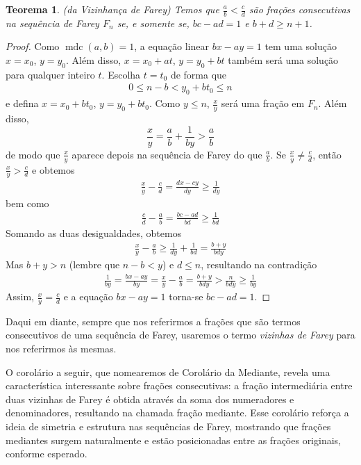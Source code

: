 \documentclass{hipatia}
\newtheorem*{theorem*}{Teorema}
\theoremstyle{definition} %
\begin{document}
\begin{theorem*} (da Vizinhança de Farey)
Temos que \(\frac{a}{b} < \frac{c}{d}\) são frações consecutivas na sequência de Farey \(F_n\) se, e somente se, \(bc - ad = 1\) e $b+d\geq n+1$.
\end{theorem*}

\begin{proof}
Como \(\operatorname{mdc}(a, b) = 1\), a equação linear \(bx - ay = 1\) tem uma solução \(x = x_0\), \(y = y_0\). Além disso, \(x = x_0 + at\), \(y = y_0 + bt\) também será uma solução para qualquer inteiro \(t\). Escolha \(t = t_0\) de forma que
\begin{align*}
0 \leq n - b < y_0 + bt_0 \leq n
\end{align*}
e defina \(x = x_0 + bt_0\), \(y = y_0 + bt_0\). Como \(y \leq n\), \(\frac{x}{y}\) será uma fração em \(F_n\). Além disso,
\[
\frac{x}{y} = \frac{a}{b} + \frac{1}{by} > \frac{a}{b}
\]
de modo que \(\frac{x}{y}\) aparece depois na sequência de Farey do que \(\frac{a}{b}\). Se \(\frac{x}{y} \neq \frac{c}{d}\), então \(\frac{x}{y} > \frac{c}{d}\) e obtemos
\begin{align*}
\frac{x}{y} - \frac{c}{d} = \frac{dx - cy}{dy} \geq \frac{1}{dy}
\end{align*}
bem como
\begin{align*}
\frac{c}{d} - \frac{a}{b} = \frac{bc - ad}{bd} \geq \frac{1}{bd}
\end{align*}
Somando as duas desigualdades, obtemos
\begin{align*}
\frac{x}{y} - \frac{a}{b} \geq \frac{1}{dy} + \frac{1}{bd} = \frac{b + y}{bdy}
\end{align*}
Mas \(b + y > n\) (lembre que \(n - b < y\)) e \(d \leq n\), resultando na contradição
\begin{align*}
\frac{1}{by} = \frac{bx - ay}{by} = \frac{x}{y} - \frac{a}{b} = \frac{b + y}{bdy} > \frac{n}{bdy} \geq \frac{1}{by}
\end{align*}
Assim, \(\frac{x}{y} = \frac{c}{d}\) e a equação \(bx - ay = 1\) torna-se \(bc - ad = 1\).
\end{proof}

Daqui em diante, sempre que nos referirmos a frações que são termos consecutivos de uma sequência de Farey, usaremos o termo \textit{vizinhas de Farey} para nos referirmos às mesmas. 

O corolário a seguir, que nomearemos de Corolário da Mediante, revela uma característica interessante sobre frações consecutivas: a fração intermediária entre duas vizinhas de Farey é obtida através da soma dos numeradores e denominadores, resultando na chamada fração mediante. Esse corolário reforça a ideia de simetria e estrutura nas sequências de Farey, mostrando que frações mediantes surgem naturalmente e estão posicionadas entre as frações originais, conforme esperado.
\end{document}
